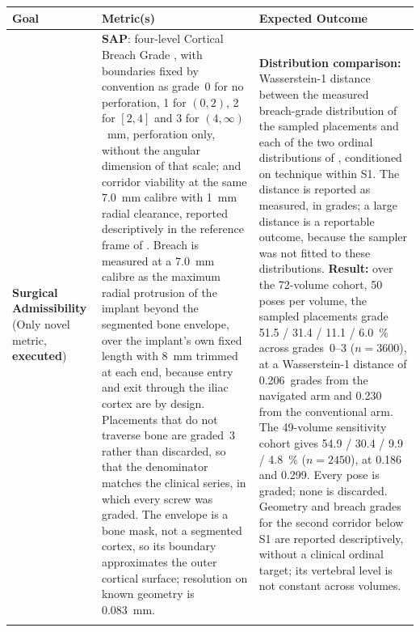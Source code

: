\documentclass[9pt]{extarticle}
\begin{document}
\begin{table}[h]
\centering
\small
\begin{tabularx}{\linewidth}{@{}p{3cm} p{4cm} X@{}}
\toprule
\textbf{Goal} & \textbf{Metric(s)} & \textbf{Expected Outcome} \\
\midrule
\textbf{Surgical Admissibility} \newline (Only novel metric, \textbf{executed}) & \textbf{SAP}: four-level Cortical Breach Grade \citep{smith2006iliosacral}, with boundaries fixed by convention as grade~0 for no perforation, 1 for $(0,2)$, 2 for $[2,4]$ and 3 for $(4,\infty)$~mm, perforation only, without the angular dimension of that scale; and corridor viability \citep{mclaren2021corridor} at the same 7.0~mm calibre with 1~mm radial clearance, reported descriptively in the reference frame of \citet{kaiser2014dysmorphism}. Breach is measured at a 7.0~mm calibre as the maximum radial protrusion of the implant beyond the segmented bone envelope, over the implant's own fixed length with 8~mm trimmed at each end, because entry and exit through the iliac cortex are by design. Placements that do not traverse bone are graded~3 rather than discarded, so that the denominator matches the clinical series, in which every screw was graded. The envelope is a bone mask, not a segmented cortex, so its boundary approximates the outer cortical surface; resolution on known geometry is 0.083~mm. & \textbf{Distribution comparison:} Wasserstein-1 distance between the measured breach-grade distribution of the sampled placements and each of the two ordinal distributions of \citet{zwingmann2009navigated}, conditioned on technique within S1. The distance is reported as measured, in grades; a large distance is a reportable outcome, because the sampler was not fitted to these distributions. \textbf{Result:} over the 72-volume cohort, 50 poses per volume, the sampled placements grade 51.5 / 31.4 / 11.1 / 6.0~\% across grades~0--3 ($n=3600$), at a Wasserstein-1 distance of 0.206~grades from the navigated arm and 0.230 from the conventional arm. The 49-volume sensitivity cohort gives 54.9 / 30.4 / 9.9 / 4.8~\% ($n=2450$), at 0.186 and 0.299. Every pose is graded; none is discarded. Geometry and breach grades for the second corridor below S1 are reported descriptively, without a clinical ordinal target; its vertebral level is not constant across volumes. \\
\addlinespace[4pt]

\end{tabularx}
\end{table}
\end{document}
